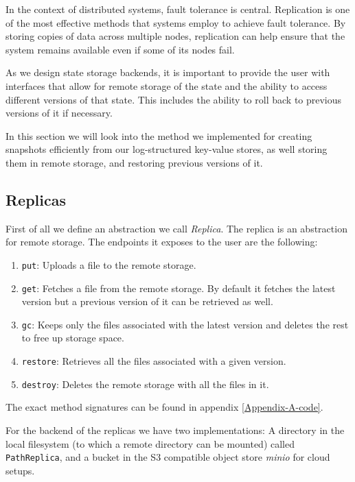 In the context of distributed systems, fault tolerance is central.
Replication is one of the most effective methods that systems employ to achieve fault tolerance. By storing copies of data across multiple nodes, replication can help ensure that the system remains available even if some of its nodes fail.

As we design state storage backends, it is important to provide the user with interfaces that allow for remote storage of the state and the ability to access different versions of that state. This includes the ability to roll back to previous versions of it if necessary.

In this section we will look into the method we implemented for creating snapshots efficiently from our log-structured key-value stores, as well storing them in remote storage, and restoring previous versions of it.

\subsection{Replicas}

First of all we define an abstraction we call \textit{Replica}.
The replica is an abstraction for remote storage.
The endpoints it exposes to the user are the following:

\begin{enumerate}
    \item \verb|put|: Uploads a file to the remote storage.
    \item \verb|get|: Fetches a file from the remote storage. By default it fetches the latest version but a previous version of it can be retrieved as well.
    \item \verb|gc|: Keeps only the files associated with the latest version and deletes the rest to free up storage space.
    \item \verb|restore|: Retrieves all the files associated with a given version.
    \item \verb|destroy|: Deletes the remote storage with all the files in it.
\end{enumerate}

The exact method signatures can be found in appendix \ref{Appendix-A-code}.

For the backend of the replicas we have two implementations: A directory in the local filesystem (to which a remote directory can be mounted) called \verb|PathReplica|, and a bucket in the S3 compatible object store \textit{minio} for cloud setups.

